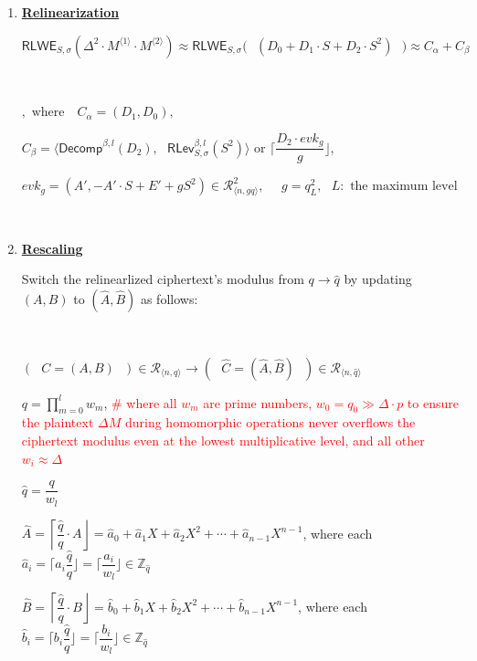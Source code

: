 \begin{tcolorbox}[title={\textbf{\tboxlabel{\ref*{subsubsec:ckks-mult-cipher-summary}} CKKS's Ciphertext-to-Ciphertext Multiplication}}]
\begin{enumerate}
$= D_0 + D_1\cdot S + D_2\cdot S^2$

$ $

\item \textbf{\underline{Relinearization}} 

$\textsf{RLWE}_{S, \sigma}(\Delta^2 \cdot M^{\langle 1 \rangle} \cdot M^{\langle 2 \rangle}) \approx \textsf{RLWE}_{S, \sigma}\bm{(}\text{ }(D_0 + D_1\cdot S + D_2\cdot S^2)\text{ }\bm{)} \approx C_\alpha + C_\beta$

$ $

$, \text{ where } \text{ } C_\alpha = (D
_1, D_0),$

\text{ }\text{ }\text{ }\text{ }\text{ }\text{ }\text{ }\text{ }\text{ } $C_\beta = \bm{\langle} \textsf{Decomp}^{\beta, l}(D_2), \text{ } \textsf{RLev}_{S, \sigma}^{\beta, l}( S^2) \bm{\rangle} \text{ or }   \Bigg\lceil\dfrac{D_2 \cdot \mathit{evk_g}}{g}\Bigg\rfloor$,

\text{ }\text{ }\text{ }\text{ }\text{ }\text{ }\text{ }\text{ }\text{ }  $\mathit{evk_g} = (A', -A'\cdot S + E' + g S^2) \in \mathcal{R}_{\langle n, gq\rangle}^2, \text{ } \text{ } g  = q_L^2, \text{ } L: \text{ the maximum level}$

$ $

\item \textbf{\underline{Rescaling}}

Switch the relinearlized ciphertext's modulus from $q \rightarrow \hat q$ 
by updating $(A, B)$ to $(\hat{A}, \hat B)$ as follows:

$ $

$(\text{ }C = (A, B)\text{ }) \in \mathcal{R}_{\langle n, q \rangle} \rightarrow (\text{ }\hat{C} = (\hat{A}, \hat{B})\text{ }) \in \mathcal{R}_{\langle n, \hat q \rangle}$ 

$q = \prod\limits_{m=0}^{l}w_m$, \textcolor{red}{ \text{ } \# where all $w_m$ are prime numbers,  $w_0 = q_0 \gg \Delta\cdot p$ to ensure the plaintext $\Delta M$ during homomorphic operations never overflows the ciphertext modulus even at the lowest multiplicative level, and all other $w_i \approx \Delta$}

$\hat{q} = \dfrac{q}{w_l}$

$\hat{A} = \left\lceil\dfrac{\hat q}{q}\cdot A\right\rfloor = \hat{a}_{0} + \hat{a}_{1}X + \hat{a}_{2}X^2 + \cdots + \hat{a}_{{n-1}}X^{n-1}$, where each $\hat{a}_{i} = \Big\lceil a_{i}\dfrac{\hat{q}}{q} \Big\rfloor = \Big\lceil \dfrac{a_{i}}{w_l} \Big\rfloor \in \mathbb{Z}_{\hat{q}}$ 


$\hat{B} = \left\lceil\dfrac{\hat q}{q}\cdot B\right\rfloor = \hat{b}_0 + \hat{b}_1X + \hat{b}_2X^2 + \cdots + \hat{b}_{n-1}X^{n-1}$, where each $\hat{b}_i = \Big\lceil b_i\dfrac{\hat{q}}{q} \Big\rfloor = \Big\lceil \dfrac{b_i}{w_l} \Big\rfloor \in \mathbb{Z}_{\hat{q}}$


\end{enumerate}
\end{tcolorbox}
